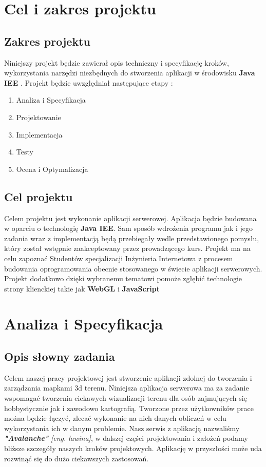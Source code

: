 \chapter{Cel i zakres projektu}
\section{Zakres projektu}
Niniejszy projekt będzie zawierał opis techniczny i specyfikację kroków, wykorzystania narzędzi niezbędnych do stworzenia aplikacji w środowisku \textbf{Java IEE} .
Projekt będzie uwzględniał następujące etapy :
\begin{enumerate}
  \item{Analiza i Specyfikacja}
  \item{Projektowanie}
  \item{Implementacja}
  \item{Testy}
  \item{Ocena i Optymalizacja}
\end{enumerate}

\section{Cel projektu}
Celem projektu jest wykonanie aplikacji serwerowej.
Aplikacja będzie budowana w oparciu o technologię \textbf{Java IEE}.
Sam sposób wdrożenia programu jak i jego zadania wraz z implementacją będą przebiegały wedle przedstawionego pomysłu, który został wstępnie zaakceptowany przez prowadzącego kurs.
Projekt ma na celu zapoznać Studentów specjalizacji Inżynieria Internetowa z procesem
budowania oprogramowania obecnie stosowanego w świecie aplikacji serwerowych.
Projekt dodatkowo dzięki wybranemu tematowi pomoże zgłębić technologie strony klienckiej
takie jak \textbf{WebGL} i \textbf{JavaScript}

\chapter{Analiza i Specyfikacja}
\section{Opis słowny zadania}
Celem naszej pracy projektowej jest stworzenie aplikacji zdolnej do tworzenia i zarządzania mapkami 3d terenu.
Niniejsza aplikacja serwerowa ma za zadanie wspomagać tworzenia ciekawych wizualizacji terenu dla osób zajmujących się hobbystycznie jak i zawodowo kartografią.
Tworzone przez użytkowników prace można będzie łączyć, zlecać wykonanie na nich danych obliczeń w celu wykorzystania ich w danym problemie.
Nasz serwis z aplikacją nazwaliśmy \\\textbf{\textit{"Avalanche"}} \textit{[eng. lawina]}, w dalszej części projektowania i założeń podamy bliższe szczegóły naszych kroków projektowych.
Aplikację w przyszłości może uda rozwinąć się do dużo ciekawszych zastosowań.
